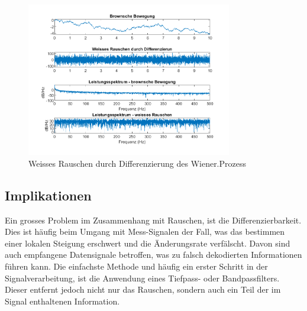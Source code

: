 
\begin{figure}
	\centering
	\includegraphics[width=0.8\textwidth]{papers/brown/images/weissesRauscheDurchBrown-timeDomain.png}
	\caption{Weisses Rauschen durch Differenzierung des Wiener.Prozess}
	\label{brown:diffWienerFFT}
\end{figure}


\subsection{Implikationen\label{brown:Rauschen:Implikationen}}

Ein grosses Problem im Zusammenhang mit Rauschen, ist die Differenzierbarkeit. Dies ist häufig beim Umgang mit Mess-Signalen der Fall, was das bestimmen einer lokalen Steigung erschwert und die Änderungsrate verfälscht. Davon sind auch empfangene Datensignale betroffen, was zu falsch dekodierten Informationen führen kann. Die einfachste Methode und häufig ein erster Schritt in der Signalverarbeitung, ist die Anwendung eines Tiefpass- oder Bandpassfilters. Dieser entfernt jedoch nicht nur das Rauschen, sondern auch ein Teil der im Signal enthaltenen Information.

